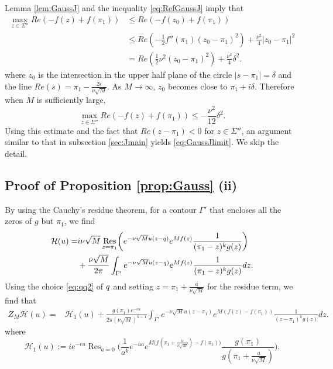 \documentclass[11pt]{article}
\DeclareMathOperator{\Res}{Res}
\begin{document}
Lemma \ref{lem:GaussJ} and the inequality \eqref{eq:RefGaussJ}
imply that
\begin{equation}
\begin{split}
  \max_{z\in\Sigma''} Re(-f(z)+f(\pi_1)) &\le Re(-f(z_0)+f(\pi_1))
  \\
  &\le Re(-\frac12f''(\pi_1)(z_0-\pi_1)^2)+
  \frac{\nu^2}4|z_0-\pi_1|^2 \\
  &= Re(\frac12\nu^2(z_0-\pi_1)^2)+
  \frac{\nu^2}4\delta^2.
\end{split}
\end{equation}
where $z_0$ is the intersection in the upper half plane of the
circle $|s-\pi_1|=\delta$ and the line
$Re(s)=\pi_1-\frac{2\epsilon}{\nu\sqrt{M}}$. As $M\to \infty$,
$z_0$ becomes close to $\pi_1+i\delta$. Therefore when $M$ is
sufficiently large,
\begin{equation}
  \max_{z\in\Sigma''} Re(-f(z)+f(\pi_1))
  \le -\frac{\nu^2}{12}\delta^2.
\end{equation}
Using this estimate and the fact that $Re(z-\pi_1)<0$ for
$z\in\Sigma''$, an argument similar to that in subsection
\ref{sec:Jmain} yields \eqref{eq:GaussJlimit}. We skip the detail.




\subsection{Proof of Proposition \ref{prop:Gauss} (ii)}\label{sec:Gauss2}

By using the Cauchy's residue theorem, for a contour $\Gamma'$
that encloses all the zeros of $g$ but $\pi_1$, we find
\begin{equation}
\begin{split}
  \mathcal{H}(u) =& i\nu \sqrt{M} \Res_{z=\pi_1} \biggl( e^{-\nu
  \sqrt{M}u(z-\qq)} e^{Mf(z)} \frac1{(\pi_1-z)^kg(z)}\biggr) \\
  &+ \frac{\nu \sqrt{M}}{2\pi} \int_{\Gamma'} e^{-\nu
  \sqrt{M}u(z-\qq)} e^{Mf(z)} \frac1{(\pi_1-z)^kg(z)} dz.
\end{split}
\end{equation}
Using the choice \eqref{eq:qq2} of $q$ and setting
$z=\pi_1+\frac{a}{\nu\sqrt{M}}$ for the residue term, we find that
\begin{equation}\label{eq:HGaussint}
\begin{split}
  Z_M \mathcal{H}(u) =& \mathcal{H}_1(u) + \frac{g(\pi_1)e^{-\epsilon u}}{2\pi (\nu\sqrt{M})^{k-1}} \int_{\Gamma'} e^{-\nu
  \sqrt{M}u(z-\pi_1)} e^{M(f(z)-f(\pi_1))} \frac{1}{(z-\pi_1)^kg(z)} dz.
\end{split}
\end{equation}
where
\begin{equation}
  \mathcal{H}_1(u):= ie^{-\epsilon u} \Res_{a=0} \biggl(
  \frac1{a^k}
  e^{-ua} e^{M\bigl( f(\pi_1+\frac{a}{\nu\sqrt{M}})-f(\pi_1)\bigr)}
  \frac{g(\pi_1)}{g(\pi_1+\frac{a}{\nu\sqrt{M}})}\biggr).
\end{equation}
\end{document}
